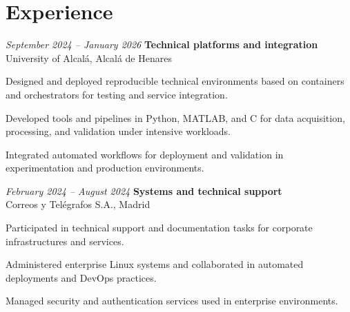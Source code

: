 \vspace{-7pt}

\section{Experience}

\begin{twocolentry}{\textit{September 2024 – January 2026}}
	\textbf{Technical platforms and integration} \\
	University of Alcalá, Alcalá de Henares
\end{twocolentry}
\begin{onecolentry}
	\begin{highlights}
		\item Designed and deployed reproducible technical environments based on containers and orchestrators for testing and service integration.
		\item Developed tools and pipelines in Python, MATLAB, and C for data acquisition, processing, and validation under intensive workloads.
		\item Integrated automated workflows for deployment and validation in experimentation and production environments.
	\end{highlights}
\end{onecolentry}

\vspace{0.2 cm}

\begin{twocolentry}{\textit{February 2024 – August 2024}}
	\textbf{Systems and technical support} \\
	Correos y Telégrafos S.A., Madrid
\end{twocolentry}
\begin{onecolentry}
	\begin{highlights}
		\item Participated in technical support and documentation tasks for corporate infrastructures and services.
		\item Administered enterprise Linux systems and collaborated in automated deployments and DevOps practices.
		\item Managed security and authentication services used in enterprise environments.
	\end{highlights}
\end{onecolentry}

\vspace{0.2 cm}

